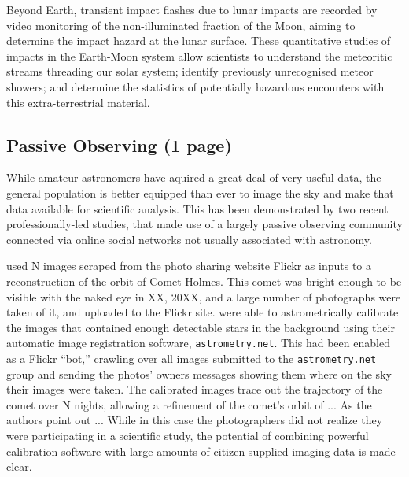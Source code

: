 \documentclass{ar2e}
\begin{document}
Beyond Earth, transient impact flashes due to lunar impacts are recorded by
video monitoring of the non-illuminated fraction of the Moon, aiming to
determine the impact hazard at the lunar surface.  These quantitative studies of
impacts in the Earth-Moon system allow scientists to understand the meteoritic
streams threading our solar system; identify previously unrecognised meteor
showers; and determine the statistics of potentially hazardous encounters with
this extra-terrestrial material. 

 





\subsection{Passive Observing (1 page)}
\label{sec:obs:passive}

While amateur astronomers have aquired a great deal of very useful data, the
general population is better equipped than ever to image the sky and make that
data available for scientific analysis. This has been demonstrated by two
recent professionally-led studies, that made use of a largely passive
observing community connected via online social networks not usually
associated with astronomy. 

\citet{Lang++2011} used N images scraped from the photo sharing website Flickr
as inputs to a reconstruction of the orbit of Comet Holmes. This comet was
bright enough to be visible with the naked eye in XX, 20XX, and a large number
of photographs were taken of it, and uploaded to the Flickr site.
\citeauthor{Lang++2011} were able to astrometrically calibrate the images that
contained enough detectable stars in the background using their automatic
image registration software, \texttt{astrometry.net}. This had been enabled as
a Flickr ``bot,'' crawling over all images submitted to the
\texttt{astrometry.net} group and sending the photos' owners messages showing
them where on the sky their images were taken. The calibrated images trace out
the trajectory of the comet over N nights, allowing a refinement of the
comet's orbit of ... As the authors point out ...  While in this case the
photographers did not realize they were participating in a scientific study,
the potential of combining powerful calibration software with large amounts of
citizen-supplied imaging data is made clear. 
\end{document}
